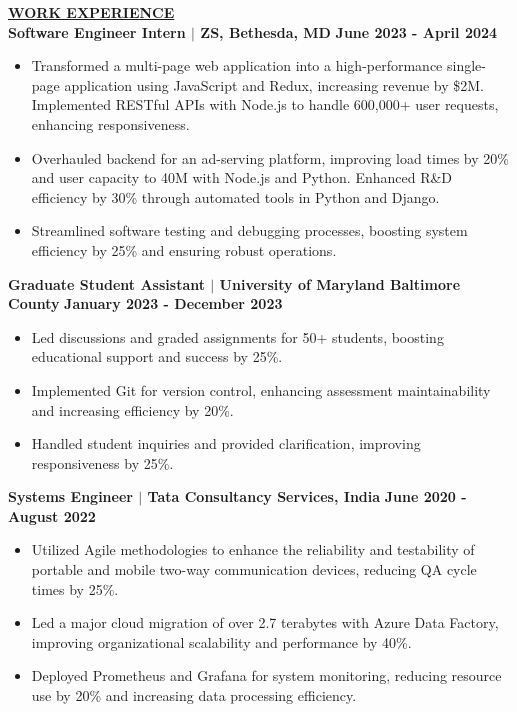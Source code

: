 \documentclass{article}
\begin{document}
\noindent \textbf{\underline{WORK EXPERIENCE}} \\
\noindent \textbf{Software Engineer Intern $\mid$ ZS, Bethesda, MD}  \hfill \textbf{June 2023 - April 2024}
\begin{itemize}[noitemsep,nolistsep,leftmargin=*]
\item {\small Transformed a multi-page web application into a high-performance single-page application using JavaScript and Redux, increasing revenue by \$2M. Implemented RESTful APIs with Node.js to handle 600,000+ user requests, enhancing responsiveness.}
\item {\small Overhauled backend for an ad-serving platform, improving load times by 20\% and user capacity to 40M with Node.js and Python. Enhanced R&D efficiency by 30\% through automated tools in Python and Django.}
\item {\small Streamlined software testing and debugging processes, boosting system efficiency by 25\% and ensuring robust operations.}
\end{itemize}

\vspace{2mm} 

\noindent \textbf{Graduate Student Assistant $\mid$ University of Maryland Baltimore County}  \hfill \textbf{January 2023 - December 2023}
\begin{itemize}[noitemsep,nolistsep,leftmargin=*]
\item {\small Led discussions and graded assignments for 50+ students, boosting educational support and success by 25\%.}
\item {\small Implemented Git for version control, enhancing assessment maintainability and increasing efficiency by 20\%.}
\item {\small Handled student inquiries and provided clarification, improving responsiveness by 25\%.}
\end{itemize}

\vspace{2mm} 

\noindent \textbf{Systems Engineer $\mid$ Tata Consultancy Services, India}  \hfill \textbf{June 2020 - August 2022}
\begin{itemize}[noitemsep,nolistsep,leftmargin=*]
\item {\small Utilized Agile methodologies to enhance the reliability and testability of portable and mobile two-way communication devices, reducing QA cycle times by 25\%.}
\item {\small Led a major cloud migration of over 2.7 terabytes with Azure Data Factory, improving organizational scalability and performance by 40\%.}
\item {\small Deployed Prometheus and Grafana for system monitoring, reducing resource use by 20\% and increasing data processing efficiency.}
\end{itemize}
\end{document}
